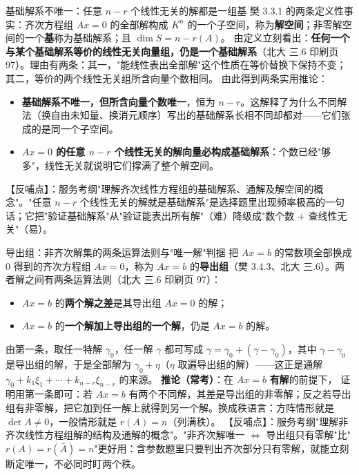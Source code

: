 \begin{fdeep}{基础解系不唯一：任意 $n-r$ 个线性无关的解都是一组基}
樊 3.3.1 的两条定义性事实：齐次方程组 $Ax=0$ 的全部解构成 $K^n$ 的一个子空间，称为\textbf{解空间}；非零解空间的一个\textbf{基}称为基础解系；且 $\dim S=n-r(A)$。
由定义立刻看出：\textbf{任何一个与某个基础解系等价的线性无关向量组，仍是一个基础解系}（北大 三.6 印刷页 97）。理由有两条：其一，"能线性表出全部解"这个性质在等价替换下保持不变；其二，等价的两个线性无关组所含向量个数相同。
由此得到两条实用推论：
\begin{itemize}[leftmargin=2.2em,itemsep=0.25em]
\item \textbf{基础解系不唯一，但所含向量个数唯一}，恒为 $n-r$。这解释了为什么不同解法（换自由未知量、换消元顺序）写出的基础解系长相不同却都对——它们张成的是同一个子空间。
\item \textbf{$Ax=0$ 的任意 $n-r$ 个线性无关的解向量必构成基础解系}：个数已经"够多"，线性无关就说明它们撑满了整个解空间。
\end{itemize}
【反哺点】：服务考纲"理解齐次线性方程组的基础解系、通解及解空间的概念"。"任意 $n-r$ 个线性无关的解就是基础解系"是选择题里出现频率极高的一句话；它把"验证基础解系"从"验证能表出所有解"（难）降级成"数个数 + 查线性无关"（易）。
\end{fdeep}

\begin{fdeep}{导出组：非齐次解集的两条运算法则与"唯一解"判据}
把 $Ax=b$ 的常数项全部换成 $0$ 得到的齐次方程组 $Ax=0$，称为 $Ax=b$ 的\textbf{导出组}（樊 3.4.3、北大 三.6）。两者解之间有两条运算法则（北大 三.6 印刷页 97）：
\begin{itemize}[leftmargin=2.2em,itemsep=0.25em]
\item $Ax=b$ 的\textbf{两个解之差}是其导出组 $Ax=0$ 的解；
\item $Ax=b$ 的\textbf{一个解加上导出组的一个解}，仍是 $Ax=b$ 的解。
\end{itemize}
由第一条，取任一特解 $\gamma_0$，任一解 $\gamma$ 都可写成 $\gamma=\gamma_0+(\gamma-\gamma_0)$，其中 $\gamma-\gamma_0$ 是导出组的解，于是全部解为 $\gamma_0+\eta$（$\eta$ 取遍导出组的解）——这正是通解 $\gamma_0+k_1\xi_1+\cdots+k_{n-r}\xi_{n-r}$ 的来源。
\textbf{推论（常考）}：在 $Ax=b$ \textbf{有解}的前提下，
证明用第一条即可：若 $Ax=b$ 有两个不同解，其差是导出组的非零解；反之若导出组有非零解，把它加到任一解上就得到另一个解。换成秩语言：方阵情形就是 $\det A\ne0$，一般情形就是 $r(A)=n$（列满秩）。
【反哺点】：服务考纲"理解非齐次线性方程组解的结构及通解的概念"。"非齐次解唯一 $\iff$ 导出组只有零解"比"$r(A)=r(\bar A)=n$"更好用：含参数题里只要判出齐次部分只有零解，就能立刻断定唯一，不必同时盯两个秩。
\end{fdeep}

